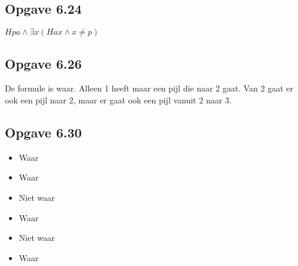 \documentclass[11pt]{article}
\newcommand{\E}{\exists}
\begin{document}
%

\subsection*{Opgave 6.24}
$Hpa \wedge \E x(Hax \wedge x \neq p) $


\subsection*{Opgave 6.26}
De formule is waar. Alleen 1 heeft maar een pijl die naar 2 gaat. Van 2 gaat er
ook een pijl naar 2, maar er gaat ook een pijl vanuit 2 naar 3.


\subsection*{Opgave 6.30}
\begin{itemize}
  \item Waar      %
  \item Waar      %
  \item Niet waar %
  \item Waar      %
  \item Niet waar %
  \item Waar
\end{itemize}
\end{document}
